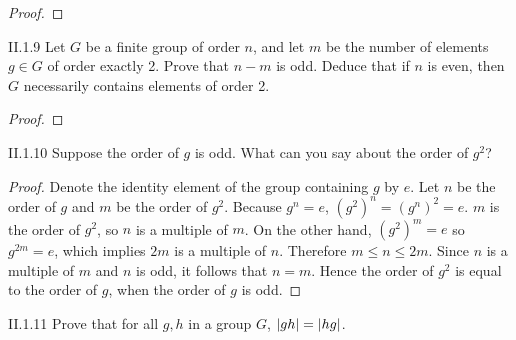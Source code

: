 \begin{proof}
\end{proof}

\begin{exercise}{II.1.9}
	Let $G$ be a finite group of order $n$, and let $m$ be the number of elements $g\in G$ of order exactly 2. Prove that $n - m$ is odd. Deduce that if $n$ is even, then $G$ necessarily contains elements of order 2.
\end{exercise}

\begin{proof}
\end{proof}

\begin{exercise}{II.1.10}
	Suppose the order of $g$ is odd. What can you say about the order of $g^{2}$?
\end{exercise}

\begin{proof}
    Denote the identity element of the group containing $g$ by $e$. Let $n$ be the order of $g$ and $m$ be the order of $g^{2}$. Because $g^{n} = e$, ${(g^{2})}^{n} = {(g^{n})}^{2} = e$. $m$ is the order of $g^{2}$, so $n$ is a multiple of $m$. On the other hand, ${(g^{2})}^{m} = e$ so $g^{2m} = e$, which implies $2m$ is a multiple of $n$. Therefore $m \leq n \leq 2m$. Since $n$ is a multiple of $m$ and $n$ is odd, it follows that $n = m$. Hence the order of $g^{2}$ is equal to the order of $g$, when the order of $g$ is odd.
\end{proof}

\begin{exercise}{II.1.11}
	Prove that for all $g, h$ in a group $G$, $\left\vert{gh}\right\vert = \left\vert{hg}\right\vert$.
\end{exercise}

